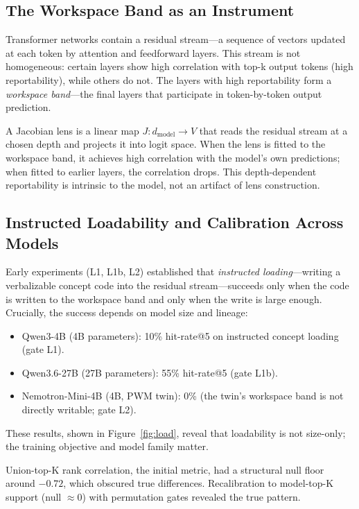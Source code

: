 \label{sec:background}

\subsection*{The Workspace Band as an Instrument}

Transformer networks contain a residual stream---a sequence of vectors updated at each token by attention
and feedforward layers.
This stream is not homogeneous: certain layers show high correlation with top-k output tokens (high reportability),
while others do not.
The layers with high reportability form a \emph{workspace band}---the final layers that participate in
token-by-token output prediction.

A Jacobian lens is a linear map $J: d_{\text{model}} \to V$ that reads the residual stream at a chosen
depth and projects it into logit space.
When the lens is fitted to the workspace band, it achieves high correlation with the model's own predictions;
when fitted to earlier layers, the correlation drops.
This depth-dependent reportability is intrinsic to the model, not an artifact of lens construction.

\subsection*{Instructed Loadability and Calibration Across Models}

Early experiments (L1, L1b, L2) established that \emph{instructed loading}---writing a verbalizable concept
code into the residual stream---succeeds only when the code is written to the workspace band and only when
the write is large enough.
Crucially, the success depends on model size and lineage:
\begin{itemize}
\item Qwen3-4B (4B parameters): 10\% hit-rate@5 on instructed concept loading (gate L1).
\item Qwen3.6-27B (27B parameters): 55\% hit-rate@5 (gate L1b).
\item Nemotron-Mini-4B (4B, PWM twin): 0\% (the twin's workspace band is not directly writable; gate L2).
\end{itemize}
These results, shown in Figure~\ref{fig:load}, reveal that loadability is not size-only;
the training objective and model family matter.

Union-top-K rank correlation, the initial metric, had a structural null floor around $-0.72$,
which obscured true differences.
Recalibration to model-top-K support (null $\approx 0$) with permutation gates revealed the true pattern.

